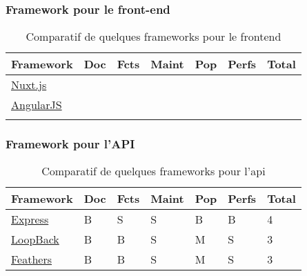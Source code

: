 \subsubsection*{Framework pour le front-end}
\begin{table}[h]
    \centering
    \begin{tabular}{| l | l | l | l | l | l | l |}
    \hline
        Framework & Doc & Fcts & Maint & Pop & Perfs & Total \\
    \hline
        \href{https://nuxtjs.org/}{Nuxt.js} &
        &  
        &
        &            
        &              
        &       \\
    \hline
        \href{https://angularjs.org/}{AngularJS} &
        &                
        &   
        &
        &              
        &       \\
    \hline
        \href{}{} &
        &                
        &     
        &
        &              
        &       \\  
    \hline
    \end{tabular}
    \caption{Comparatif de quelques frameworks pour le \Gls{frontend}}
\end{table}


\subsubsection*{Framework pour l'API}


\begin{table}[h]
    \centering
    \begin{tabular}{| l | l | l | l | l | l | l |}
    \hline
        Framework & Doc & Fcts & Maint & Pop & Perfs & Total \\
    \hline
        \href{https://expressjs.com/}{Express} &
        B &  
        S &
        S &            
        B &              
        B &
        4 \\
    \hline
        \href{https://loopback.io/}{LoopBack} &
        B &                
        B &   
        S &
        M &              
        S &      
        3 \\
    \hline
        \href{https://feathersjs.com/}{Feathers} &
        B &                
        B &     
        S &
        M &              
        S &       
        3 \\  
    \hline
    \end{tabular}
    \caption{Comparatif de quelques frameworks pour l'\Gls{api}}
\end{table}
\thinspace %

